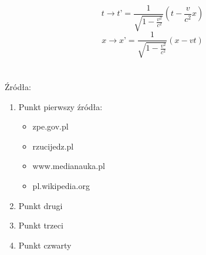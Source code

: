 \documentclass[14pt]{beamer}
\begin{document}
\begin{frame}{\color{black}{Wzór}}

\begin{displaymath}
    t \rightarrow t’ = \frac{1}{\sqrt{1-\frac{v^{2}}{c^{2}}}}(t-\frac{v}{c^{2}}x)
\end{displaymath}
\begin{displaymath}
    x \rightarrow x’ = \frac{1}{\sqrt{1-\frac{v^{2}}{c^{2}}}}(x-vt)
\end{displaymath}

\end{frame}

\section{}

\begin{frame}{\color{black}{Dziękuję za uwagę}}

    Źródła:
    \begin{enumerate}
    \item Punkt pierwszy źródła:
        \begin{itemize}
        \item zpe.gov.pl
        \item rzucijedz.pl
        \item www.medianauka.pl
        \item pl.wikipedia.org
    \end{itemize}
    \item Punkt drugi
    \item Punkt trzeci
    \item Punkt czwarty
    \end{enumerate}
    
\end{frame}
\end{document}
